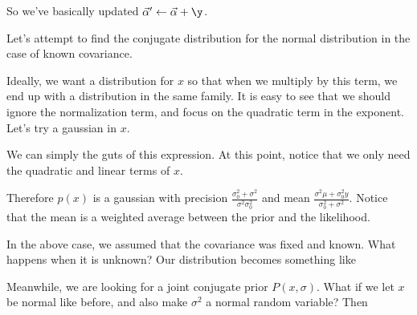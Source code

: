 \documentclass[12pt]{article}
\begin{document}
So we've basically updated $\vec \alpha' \leftarrow \vec \alpha+\y$.

Let's attempt to find the conjugate distribution for the normal distribution in the case of known covariance.


Ideally, we want a distribution for $x$ so that when we multiply by this term, we end up with a distribution in the same family. It is easy to see that we should ignore the normalization term, and focus on the quadratic term in the exponent. Let's try a gaussian in $x$.


We can simply the guts of this expression. At this point, notice that we only need the quadratic and linear terms of $x$. 


Therefore $p(x)$ is a gaussian with precision $\frac{\sigma_0^2 + \sigma^2}{\sigma^2 \sigma_0^2}$ and mean $\frac{\sigma^2 \mu + \sigma_0^2 y}{\sigma_0^2 + \sigma^2}$. Notice that the mean is a weighted average between the prior and the likelihood.

In the above case, we assumed that the covariance was fixed and known. What happens when it is unknown? Our distribution becomes something like


Meanwhile, we are looking for a joint conjugate prior $P(x, \sigma)$. What if we let $x$ be normal like before, and also make $\sigma^2$ a normal random variable? Then
\end{document}
